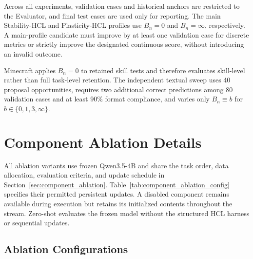 \documentclass{article}
\begin{document}
Across all experiments, validation cases and historical anchors are restricted
to the Evaluator, and final test cases are used only for reporting. The main
Stability-HCL and Plasticity-HCL profiles use $B_n=0$ and $B_n=\infty$,
respectively. A main-profile candidate must improve by at least one validation
case for discrete metrics or strictly improve the designated continuous
score, without introducing an invalid outcome.

Minecraft applies $B_n=0$ to retained skill tests and therefore evaluates
skill-level rather than full task-level retention. The independent textual
sweep uses 40 proposal opportunities, requires two additional correct
predictions among 80 validation cases and at least 90\% format compliance,
and varies only $B_n\equiv b$ for $b\in\{0,1,3,\infty\}$.

\section{Component Ablation Details}
\label{app:component_ablation_details}

All ablation variants use frozen Qwen3.5-4B and share the task order, data
allocation, evaluation criteria, and update schedule in
Section~\ref{sec:component_ablation}. Table~\ref{tab:component_ablation_config}
specifies their permitted persistent updates. A disabled component remains
available during execution but retains its initialized contents throughout
the stream. Zero-shot evaluates the frozen model without the structured HCL
harness or sequential updates.

\subsection{Ablation Configurations}
\end{document}
